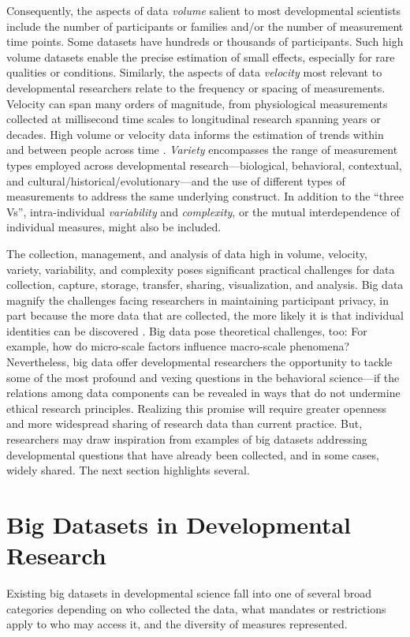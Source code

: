 \documentclass[letterpaper,man,apacite,natbib]{apa6}
\begin{document}
Consequently, the aspects of data \emph{volume} salient to most developmental scientists include the number of participants or families and/or the number of measurement time points.
Some datasets have hundreds or thousands of participants.
Such high volume datasets enable the precise estimation of small effects, especially for rare qualities or conditions.
Similarly, the aspects of data \emph{velocity} most relevant to developmental researchers relate to the frequency or spacing of measurements.
Velocity can span many orders of magnitude, from physiological measurements collected at millisecond time scales to longitudinal research spanning years or decades.
High volume or velocity data informs the estimation of trends within and between people across time \cite{rietveld_replicability_2014}.
\emph{Variety} encompasses the range of measurement types employed across developmental research---biological, behavioral, contextual, and cultural/historical/evolutionary---and the use of different types of measurements to address the same underlying construct.
In addition to the ``three Vs'', intra-individual \emph{variability} and \emph{complexity}, or the mutual interdependence of individual measures, might also be included.

The collection, management, and analysis of data high in volume, velocity, variety, variability, and complexity poses significant practical challenges for data collection, capture, storage, transfer, sharing, visualization, and analysis.
Big data magnify the challenges facing researchers in maintaining participant privacy, in part because the more data that are collected, the more likely it is that individual identities can be discovered \cite{sweeney_identifiability}.
Big data pose theoretical challenges, too: For example, how do micro-scale factors influence macro-scale phenomena?
Nevertheless, big data offer developmental researchers the opportunity to tackle some of the most profound and vexing questions in the behavioral science---if the relations among data components can be revealed in ways that do not undermine ethical research principles.
Realizing this promise will require greater openness and more widespread sharing of research data than current practice.
But, researchers may draw inspiration from examples of big datasets addressing developmental questions that have already been collected, and in some cases, widely shared.
The next section highlights several.

\section{Big Datasets in Developmental Research}
Existing big datasets in developmental science fall into one of several broad categories depending on who collected the data, what mandates or restrictions apply to who may access it, and the diversity of measures represented.
\end{document}
